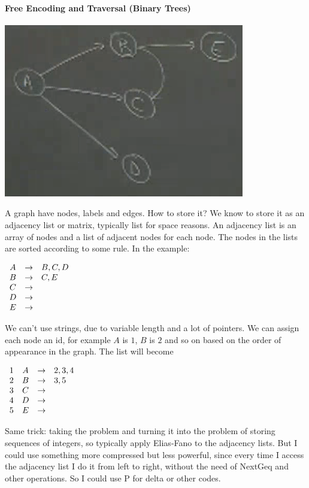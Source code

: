 \documentclass[10pt]{report}
\begin{document}
\paragraph{Free Encoding and Traversal (Binary Trees)} 
\begin{center}
	\includegraphics[scale=0.5]{13.png}
\end{center}
A graph have nodes, labels and edges. How to store it? We know to store it as an adjacency list or matrix, typically list for space reasons. An adjacency list is an array of nodes and a list of adjacent nodes for each node. The nodes in the lists are sorted according to some rule. In the example:
\begin{center}
	$\begin{array}{c c l}
	A&\rightarrow&B,C,D\\
	B&\rightarrow&C,E\\
	C&\rightarrow&\\
	D&\rightarrow&\\
	E&\rightarrow&
	\end{array}$
\end{center}
We can't use strings, due to variable length and a lot of pointers. We can assign each node an id, for example $A$ is $1$, $B$ is $2$ and so on based on the order of appearance in the graph. The list will become
\begin{center}
	$\begin{array}{c c c l}
	1&A&\rightarrow&2,3,4\\
	2&B&\rightarrow&3,5\\
	3&C&\rightarrow&\\
	4&D&\rightarrow&\\
	5&E&\rightarrow&
	\end{array}$
\end{center}
Same trick: taking the problem and turning it into the problem of storing sequences of integers, so typically apply Elias-Fano to the adjacency lists. But I could use something more compressed but less powerful, since every time I access the adjacency list I do it from left to right, without the need of NextGeq and other operations. So I could use P for delta or other codes.\\\\
\end{document}
